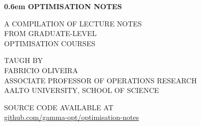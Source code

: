 
\newcommand\nbvspace[1][3]{\vspace*{\stretch{#1}}}

\newcommand\nbstretchyspace{\spaceskip0.5em plus 0.25em minus 0.25em}

\newcommand{\nbtitlestretch}{\spaceskip0.6em}

\thispagestyle{empty}

\begin{center}
	\bfseries
	\nbvspace[1]
	\Huge
	{\nbtitlestretch\huge
	OPTIMISATION NOTES}
	
	\nbvspace[1]
	\normalsize
	
	A COMPILATION OF LECTURE NOTES \\
	FROM GRADUATE-LEVEL \\
	OPTIMISATION COURSES 
	
	\nbvspace[1]
	\small TAUGH BY\\
	\Large FABRICIO OLIVEIRA\\[0.5em]
	\footnotesize ASSOCIATE PROFESSOR OF OPERATIONS RESEARCH\\
	AALTO UNIVERSITY, SCHOOL OF SCIENCE
	
	\nbvspace[2]
	
	
	
	\normalsize
	
	SOURCE CODE AVAILABLE AT\\
	
	\large
	{\color{blue}\href{https://github.com/gamma-opt/optimisation-notes}{github.com/gamma-opt/optimisation-notes}}
	
	\nbvspace[1]
\end{center}



